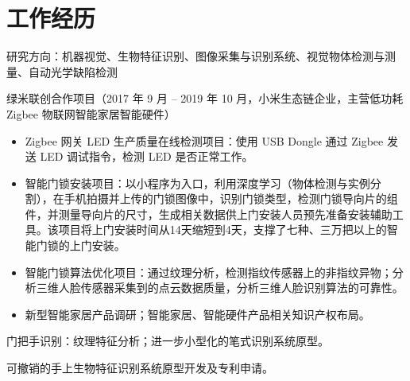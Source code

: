 \documentclass[]{deedy-resume-openfont}
\begin{document}
%
%
\lastupdated

%
%





\section{工作经历}

\begin{tightemize}
\item 研究方向：机器视觉、生物特征识别、图像采集与识别系统、视觉物体检测与测量、自动光学缺陷检测
\item 绿米联创合作项目（2017 年 9 月 – 2019 年 10 月，小米生态链企业，主营低功耗 Zigbee 物联网智能家居智能硬件）
\begin{itemize}
\item Zigbee 网关 LED 生产质量在线检测项目：使用 USB Dongle 通过 Zigbee 发送 LED 调试指令，检测 LED 是否正常工作。
\item 智能门锁安装项目：以小程序为入口，利用深度学习（物体检测与实例分割），在手机拍摄并上传的门锁图像中，识别门锁类型，检测门锁导向片的组件，并测量导向片的尺寸，生成相关数据供上门安装人员预先准备安装辅助工具。该项目将上门安装时间从14天缩短到4天，支撑了七种、三万把以上的智能门锁的上门安装。
\item 智能门锁算法优化项目：通过纹理分析，检测指纹传感器上的非指纹异物；分析三维人脸传感器采集到的点云数据质量，分析三维人脸识别算法的可靠性。
\item 新型智能家居产品调研；智能家居、智能硬件产品相关知识产权布局。
\end{itemize}
\item 门把手识别：纹理特征分析；进一步小型化的笔式识别系统原型。
\item 可撤销的手上生物特征识别系统原型开发及专利申请。
\end{tightemize}
\sectionsep
\end{document}
